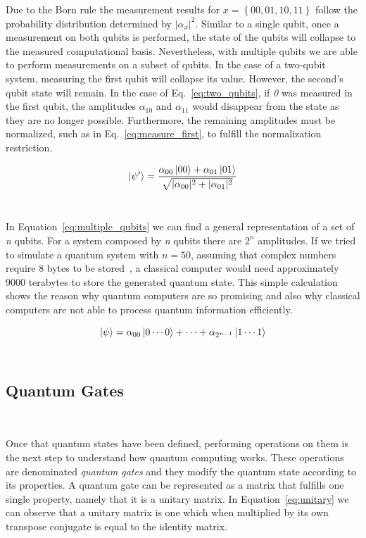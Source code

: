 Due to the Born rule the measurement results for
\(x = \left\{00, 01, 10, 11\right\}\) follow the probability
distribution determined by \(|\alpha_{x}|^2\). Similar to a
single qubit, once a measurement on both qubits is performed,
the state of the qubits will collapse to the measured computational
basis. Nevertheless, with multiple qubits we are able to perform
measurements on a subset of qubits. In the case of a two-qubit
system, measuring the first qubit will collapse its value. However,
the second's qubit state will remain. In the case of Eq.~\ref{eq:two_qubits},
if \textit{0} was measured in the first qubit, the amplitudes \(\alpha_{10}\)
and \(\alpha_{11}\) would disappear from the state as they are no longer
possible. Furthermore, the remaining amplitudes must be normalized,
such as in Eq.~\ref{eq:measure_first}, to fulfill the normalization
restriction.  \

\begin{equation}\label{eq:measure_first}
  \ket{\psi'} = \frac{\alpha_{00}\ket{00} + \alpha_{01}\ket{01}}
                    {\sqrt{|\alpha_{00}|^2 + |\alpha_{01}|^2}}
\end{equation} \

In Equation~\ref*{eq:multiple_qubits} we can find a general representation of
a set of \textit{n} qubits. For a system composed by \textit{n} qubits there are \(2^n\)
amplitudes. If we tried to simulate a quantum system with \(n = 50\), assuming
that complex numbers require 8 bytes to be stored~\cite{harris_array_2020}, a classical computer would need
approximately 9000 terabytes to store the generated quantum state. This simple calculation
shows the reason why quantum computers are so promising and also why classical computers
are not able to process quantum information efficiently. \

\begin{equation}\label{eq:multiple_qubits}
  \ket{\psi} = \alpha_{00}\ket{0\cdots0} + \cdots + \alpha_{2^{n-1}}\ket{1\cdots1}
\end{equation} \

\subsection{Quantum Gates}\label{subsection:gates}\

Once that quantum states have been defined, performing operations
on them is the next step to understand how quantum computing works.
These operations are denominated \textit{quantum gates} and they
modify the quantum state according to its properties. A quantum gate
can be represented as a matrix that fulfills one single property,
namely that it is a unitary matrix. In Equation~\ref{eq:unitary} we
can observe that a unitary matrix is one which when multiplied by its
own transpose conjugate is equal to the identity matrix.

